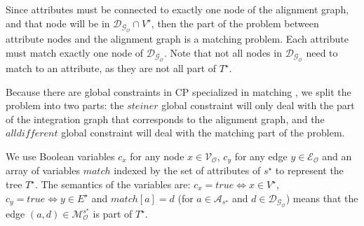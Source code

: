 \documentclass[letterpaper]{article} %
\newcommand{\forijcai}[1]{}
\begin{document}
Since attributes must be connected to exactly one node of the alignment 
graph, and that node will be in $\mathcal{D_{G_O}} \cap V^\star$, 
then the part of the problem between attribute nodes and the alignment graph is 
\forijcai{actually} a matching problem. Each attribute must match exactly one node of 
$\mathcal{D_{G_O}}$. Note that not all nodes in $\mathcal{D_{G_O}}$ need to match 
to an attribute, as they are not all part of $T^\star$.

Because there are global constraints in CP specialized in matching 
\cite{regin1994filtering}, we split the problem into two parts: the 
$\mathit{steiner}$ global constraint \cite{deuna2016steiner} will only deal with the part of the 
integration graph that corresponds to the alignment graph, and the 
$\mathit{alldifferent}$ global constraint will deal with the matching part of 
the problem.

We use Boolean variables $c_x$ for any node $x \in 
\mathcal{V_O}$, $c_y$ for any edge $y \in \mathcal{E_O}$ and an array of variables $match$ indexed by the set of attributes of $s^\star$ to represent the tree $T^\star$. The semantics of the variables are: $c_x = \mathit{true} \Leftrightarrow x \in V^\star$, $c_y = \mathit{true} \Leftrightarrow y \in E^\star$ and 
$match[a] = d$ (for $a \in \mathcal{A}_{s^\star}$ and $d \in 
\mathcal{D_{G_O}}$) means that the edge $(a,d) \in 
\mathcal{M}_\mathcal{O}^{s^\star}$ is part of $T^\star$.
\end{document}
